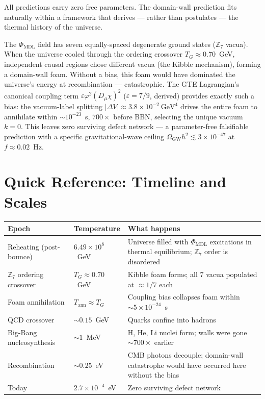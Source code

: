 \documentclass[11pt,a4paper]{article}
\newcommand{\PHIMDL}{\Phi_{\mathrm{MDL}}}
\newcommand{\ZS}{\mathbb{Z}_7}
\begin{document}
\medskip
\noindent
All predictions carry zero free parameters.
The domain-wall prediction fits naturally within a framework that derives ---
rather than postulates --- the thermal history of the universe.

\bigskip
\begin{tcolorbox}[colback=boxblue,colframe=blue!40!black,
  title=One-paragraph summary of the Z7 defect-cosmology result]
The $\PHIMDL$ field has seven equally-spaced degenerate ground states
($\ZS$ vacua).
When the universe cooled through the ordering crossover $T_G \approx
0.70$~GeV, independent causal regions chose different vacua (the Kibble
mechanism), forming a domain-wall foam.
Without a bias, this foam would have dominated the universe's energy at
recombination --- catastrophic.
The GTE Lagrangian's canonical coupling term $\varepsilon\varphi^2(D_\mu\chi)^2$
($\varepsilon = 7/9$, derived) provides exactly such a bias: the vacuum-label
splitting $|\Delta V| \approx 3.8\times10^{-2}~\text{GeV}^4$ drives the
entire foam to annihilate within $\sim 10^{-23}$~s, $700\times$ before BBN,
selecting the unique vacuum $k = 0$.
This leaves zero surviving defect network --- a parameter-free falsifiable
prediction with a specific gravitational-wave ceiling
$\Omega_\mathrm{GW} h^2 \lesssim 3\times10^{-47}$ at $f \approx 0.02$~Hz.
\end{tcolorbox}

\appendix
\section{Quick Reference: Timeline and Scales}

\begin{center}
\begin{tabular}{P{3.8cm} P{3.2cm} P{5.5cm}}
\toprule
\textbf{Epoch} & \textbf{Temperature} & \textbf{What happens} \\
\midrule
Reheating (post-bounce) & $6.49\times10^8$~GeV & Universe filled with $\PHIMDL$
  excitations in thermal equilibrium; $\ZS$ order is disordered \\[4pt]
$\ZS$ ordering crossover & $T_G \approx 0.70$~GeV & Kibble foam forms; all
  7 vacua populated at $\approx 1/7$ each \\[4pt]
Foam annihilation & $T_\mathrm{ann} \approx T_G$ & Coupling bias collapses
  foam within $\sim 5\times10^{-24}$~s \\[4pt]
QCD crossover & $\sim 0.15$~GeV & Quarks confine into hadrons \\[4pt]
Big-Bang nucleosynthesis & $\sim 1$~MeV & H, He, Li nuclei form;
  walls were gone $\sim 700\times$ earlier \\[4pt]
Recombination & $\sim 0.25$~eV & CMB photons decouple;
  domain-wall catastrophe would have occurred here without the bias \\[4pt]
Today & $2.7\times10^{-4}$~eV & Zero surviving defect network \\
\bottomrule
\end{tabular}
\end{center}
\end{document}
